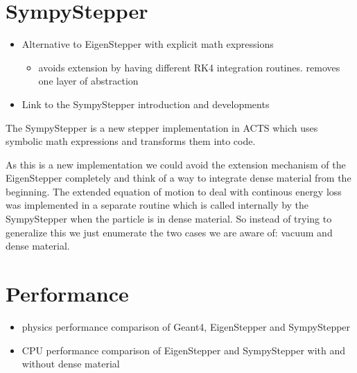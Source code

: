 \section{SympyStepper}

\begin{itemize}
    \color{red}
    \item Alternative to EigenStepper with explicit math expressions
    \begin{itemize}
        \item avoids extension by having different RK4 integration routines. removes one layer of abstraction
    \end{itemize}
    \item Link to the SympyStepper introduction and developments
\end{itemize}

The SympyStepper is a new stepper implementation in ACTS which uses symbolic math expressions and transforms them into code.

As this is a new implementation we could avoid the extension mechanism of the EigenStepper completely and think of a way to integrate dense material from the beginning. The extended equation of motion to deal with continous energy loss was implemented in a separate routine which is called internally by the SympyStepper when the particle is in dense material. So instead of trying to generalize this we just enumerate the two cases we are aware of: vacuum and dense material.

\section{Performance}

\begin{itemize}
    \color{red}
    \item physics performance comparison of Geant4, EigenStepper and SympyStepper
    \item CPU performance comparison of EigenStepper and SympyStepper with and without dense material
\end{itemize}
